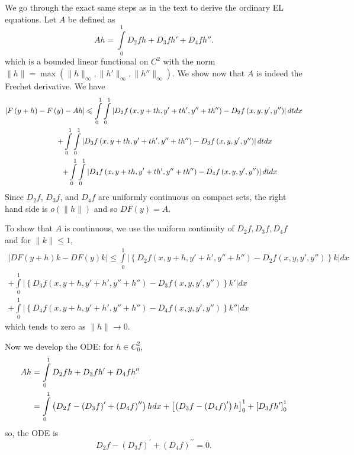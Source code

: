 \documentclass[letterpaper,twoside,11pt]{article}
\theoremstyle{mystyle}
\newcommand{\cblu}{\color{blue}}
\begin{document}
\cblu 
  We go through the exact same steps as in the text to derive the ordinary EL equations. Let $A$ be defined as 
  \[Ah = \int\limits_0^1 D_2f h + D_3f h' + D_4f h''.\]
  which is a bounded linear functional on $C^2$ with the norm $\|h\| = \max(\|h\|_{\infty}, \|h'\|_{\infty}, \|h''\|_{\infty})$. 
  We show now that $A$ is indeed the Frechet derivative. We have 
  \[\begin{gathered}
    \left| {F\left( {y + h} \right) - F\left( y \right) - Ah} \right| \leqslant \int\limits_0^1 {\int\limits_0^1 {\left| {{D_2}f\left( {x,y + th,y' + th',y'' + th''} \right) - {D_2}f\left( {x,y,y',y''} \right)} \right|dtdx} }  \hfill \\
     \quad\quad\quad \qquad \qquad + \int\limits_0^1 {\int\limits_0^1 {\left| {{D_3}f\left( {x,y + th,y' + th',y'' + th''} \right) - {D_3}f\left( {x,y,y',y''} \right)} \right|dtdx} }  \hfill \\
     \,\,\qquad \qquad + \int\limits_0^1 {\int\limits_0^1 {\left| {{D_4}f\left( {x,y + th,y' + th',y'' + th''} \right) - {D_4}f\left( {x,y,y',y''} \right)} \right|dtdx} } 
  \end{gathered} \]
  Since $D_2f$, $D_3f$, and $D_4f$ are uniformly continuous on compact sets, the right hand side is $o(\|h\|)$ and so $DF(y) = A$. 

  To show that $A$ is continuous, we use the uniform continuity of $D_2f, D_3f, D_4f$ and for $\|k\| \leq 1$, 
  \[\begin{gathered}
    \left| {DF\left( {y + h} \right)k - DF\left( y \right)k} \right| \leqslant \int\limits_0^1 {\left| {\left\{ {{D_2}f\left( {x,y + h,y' + h',y'' + h''} \right) - {D_2}f\left( {x,y,y',y''} \right)} \right\}k} \right|dx}   \\
     + \int\limits_0^1 {\left| {\left\{ {{D_3}f\left( {x,y + h,y' + h',y'' + h''} \right) - {D_3}f\left( {x,y,y',y''} \right)} \right\}k'} \right|dx} \\
     + \int\limits_0^1 {\left| {\left\{ {{D_4}f\left( {x,y + h,y' + h',y'' + h''} \right) - {D_4}f\left( {x,y,y',y''} \right)} \right\}k''} \right|dx}  
  \end{gathered} \]
  which tends to zero as $\|h\| \to 0$. 

  Now we develop the ODE: for $h \in C_0^2$, 
  \begin{align*}
      Ah &= \int\limits_0^1 {{D_2}fh + {D_3}fh' + {D_4}fh''}  \hfill \\
       &= \int\limits_0^1 {\left( {{D_2}f - {{\left( {{D_3}f} \right)}^\prime } + {{\left( {{D_4}f} \right)}^{\prime \prime }}} \right)hdx}  + \left[ {\left( {{D_3}f - {{\left( {{D_4}f} \right)}^\prime }} \right)h} \right]_0^1 + \left[ {{D_3}fh'} \right]_0^1 
  \end{align*}
  so, the ODE is 
  \[{{D_2}f - {{\left( {{D_3}f} \right)}^\prime } + {{\left( {{D_4}f} \right)}^{\prime \prime }}}=0.\]
\end{document}
